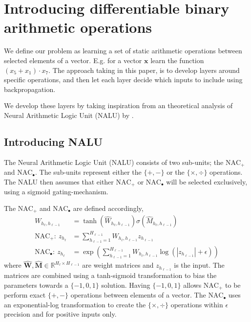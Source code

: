 \section{Introducing differentiable binary arithmetic operations}
\label{sec:Nalu}
We define our problem as learning a set of static arithmetic operations between selected elements of a vector. E.g. for a vector $\mathbf{x}$ learn the function ${(x_5 + x_1) \cdot x_7}$. The approach taking in this paper, is to develop layers around specific operations, and then let each layer decide which inputs to include using backpropagation.

We develop these layers by taking inspiration from an theoretical analysis of Neural Arithmetic Logic Unit (NALU) by \citet{trask-nalu}.

\subsection{Introducing NALU}
The Neural Arithmetic Logic Unit (NALU) consists of two sub-units; the $\text{NAC}_{+}$ and $\text{NAC}_{\bullet}$. The sub-units represent either the $\{+, -\}$ or the $\{\times, \div \}$ operations. The NALU then assumes that either $\text{NAC}_{+}$ or $\text{NAC}_{\bullet}$ will be selected exclusively, using a sigmoid gating-mechanism.

The $\text{NAC}_{+}$ and $\text{NAC}_{\bullet}$ are defined accordingly,
\begin{align}
W_{h_\ell, h_{\ell-1}} &= \tanh(\hat{W}_{h_\ell, h_{\ell-1}}) \sigma(\hat{M}_{h_\ell, h_{\ell-1}}) \label{eq:weight}\\
\textrm{NAC}_+:\ z_{h_\ell} &= \sum_{h_{\ell-1}=1}^{H_{\ell-1}} W_{h_{\ell}, h_{\ell-1}} z_{h_{\ell-1}} \label{eq:naca}\\
\textrm{NAC}_\bullet:\ z_{h_\ell} &= \exp\left(\sum_{h_{\ell-1}=1}^{H_{\ell-1}} W_{h_{\ell}, h_{\ell-1}} \label{eq:nacm}\log(|z_{h_{\ell-1}}| + \epsilon) \right)
\end{align}
where $\hat{\mathbf{W}}, \hat{\mathbf{M}} \in \mathbb{R}^{H_{\ell} \times H_{\ell-1}}$ are weight matrices and $z_{h_{\ell-1}}$ is the input. The matrices are combined using a tanh-sigmoid transformation to bias the parameters towards a $\{-1,0,1\}$ solution. Having $\{-1,0,1\}$ allows $\text{NAC}_{+}$ to be perform exact $\{+, -\}$ operations between elements of a vector.
The $\text{NAC}_{\bullet}$ uses an exponential-log transformation to create the $\{\times, \div \}$ operations within $\epsilon$ precision and for positive inputs only.

